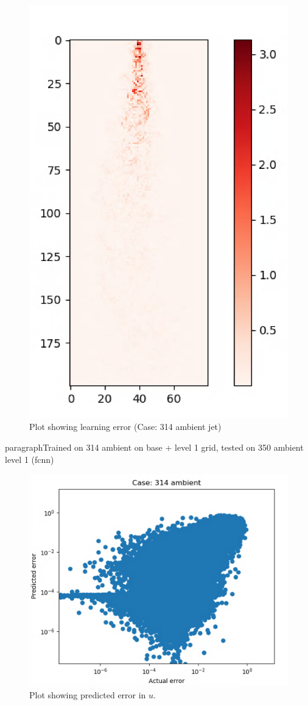 \documentclass{article}
\begin{document}
\begin{figure}[h!]
    \centering
    \includegraphics[width = 0.9\linewidth]{figures/314_350_slices_error.png}
    \caption{Plot showing learning error (Case: 314 ambient jet)}
    \label{amr_err}
\end{figure}

paragraph{Trained on 314 ambient on base + level 1 grid, tested on 350 ambient level 1 (fcnn)}

\begin{figure}[h!]
    \centering
    \includegraphics[width = 0.85\linewidth]{figures/314_01_12_350_12_error_scatter.png}
    \caption{Plot showing predicted error in $u$.}
    \label{amr_err}
\end{figure}
\end{document}
